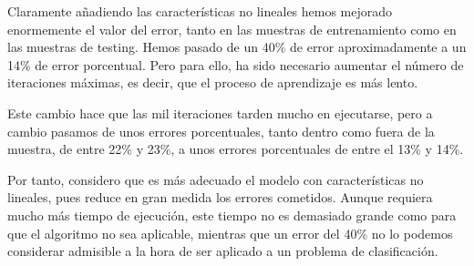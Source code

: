 \documentclass[11pt]{article}
\begin{document}
Claramente añadiendo las características no lineales hemos mejorado enormemente el valor del error, tanto en las muestras de entrenamiento como en las muestras de testing. Hemos pasado de un 40\% de error aproximadamente a un 14\% de error porcentual. Pero para ello, ha sido necesario aumentar el número de iteraciones máximas, es decir, que el proceso de aprendizaje es más lento.

Este cambio hace que las mil iteraciones tarden mucho en ejecutarse, pero a cambio pasamos de unos errores porcentuales, tanto dentro como fuera de la muestra, de entre 22\% y 23\%, a unos errores porcentuales de entre el 13\%  y 14\%.

Por tanto, considero que es más adecuado el modelo con características no lineales, pues reduce en gran medida los errores cometidos. Aunque requiera mucho más tiempo de ejecución, este tiempo no es demasiado grande como para que el algoritmo no sea aplicable, mientras que un error del 40\% no lo podemos considerar admisible a la hora de ser aplicado a un problema de clasificación.
\end{document}
